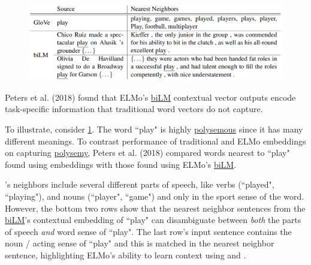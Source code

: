 {

\begin{figure}
\begin{center}
    \vspace{-18pt}
    \includegraphics[width=\linewidth]{imgs/table_elmoPlayExamples.png}
\end{center}
\vspace{-15pt}
\label{tbl:elmoPlayExample}
\end{figure}


Peters et al. (2018) found that ELMo's \hyperref[sec:BidirectionalLM]{biLM} contextual vector outputs encode task-specific information that traditional word vectors do not capture. 

To illustrate, consider \cref{tbl:elmoPlayExample}. The word ``play" is highly \hyperref[sec:PolysemyAgainInElmo]{polysemous} since it has many different meanings. To contrast performance of traditional and ELMo embeddings on capturing \hyperref[sec:Polysemy]{polysemy}, Peters et al. (2018) compared words nearest to ``play" found using  embeddings with those found using ELMo's \hyperref[sec:BidirectionalLM]{biLM}. 



's neighbors include several different parts of speech, like verbs (``played", ``playing"), and nouns (``player", ``game") and only in the sport sense of the word. However, the bottom two rows show that the nearest neighbor sentences from the \hyperref[sec:BidirectionalLM]{biLM}'s contextual embedding of ``play" can disambiguate between \emph{both} the parts of speech \emph{and} word sense of ``play". The last row's input sentence contains the noun / acting sense of ``play" and this is matched in the nearest neighbor sentence, highlighting ELMo's ability to learn context using  and . 

}
